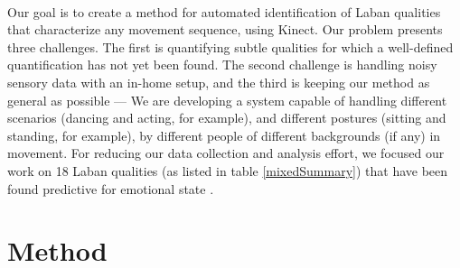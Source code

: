 \documentclass[11pt,twocolumn,varwidth=true,a4paper,fleqn]{sigchi}
\begin{document}
\mbox{}\\
\par
Our goal is to create a method for automated identification of Laban qualities that
characterize any movement sequence, using Kinect.
Our problem presents three challenges. The first is
quantifying subtle qualities for which a well-defined quantification has not yet been found.
The second challenge is handling noisy sensory data with an in-home setup, and the
third is keeping our method as general as possible --- We are developing a system capable of
handling different scenarios (dancing and acting, for example), and different postures
(sitting and standing, for example), by different people of different backgrounds (if any)
in movement. For reducing our data collection and analysis effort, we focused our work on 18 Laban qualities
(as listed in table \ref{mixedSummary}) that have been found predictive for emotional state
\cite{ShafirPrivate}.

\section{Method}
\end{document}
